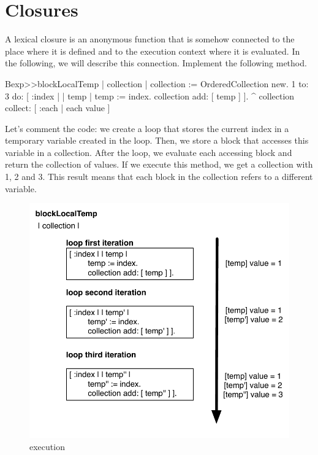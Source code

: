 \documentclass[a4paper,10pt,twoside]{book}
\begin{document}
\section{Closures}


A lexical closure is an anonymous function that is somehow connected to the place where it is defined and to the execution context where it is evaluated. In the following, we will describe this connection. Implement the following method.

\begin{code}{}
Bexp>>blockLocalTemp
	| collection |
	collection := OrderedCollection new.
	1 to: 3 do: [ :index |
		| temp |
		temp := index.
		collection add: [ temp ] ].
	^ collection collect: [ :each | each value ]
\end{code}

Let's comment the code: we create a loop that stores the current index in a temporary variable  created in the loop. Then, we store a block that accesses this variable in a collection. After the loop, we evaluate each accessing block and return the collection of values. If we execute this method, we get a collection with 1, 2 and 3. This result means that each block in the collection refers to a different  variable.

\begin{figure}
	\centering
        \includegraphics[width=0.7\linewidth]{blockClosureLocalTemp}
	\caption{ execution}
	\label{fig:blockLocalTempExecution}
\end{figure}
\end{document}
